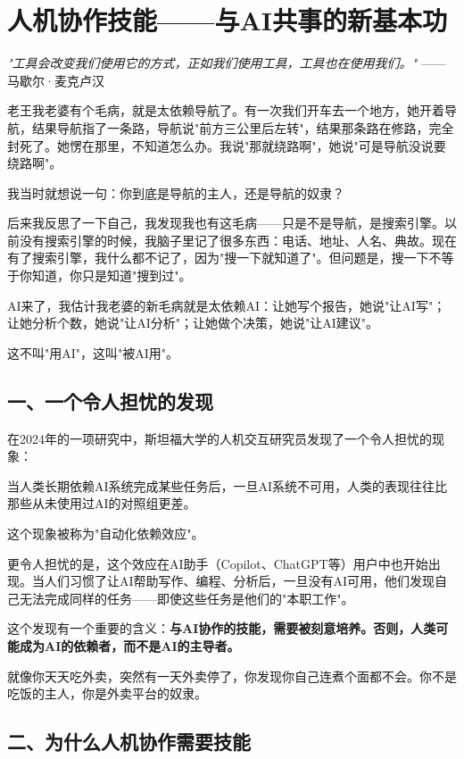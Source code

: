 \chapter{人机协作技能——与AI共事的新基本功}


\textit{"工具会改变我们使用它的方式，正如我们使用工具，工具也在使用我们。"}
——马歇尔·麦克卢汉


老王我老婆有个毛病，就是太依赖导航了。有一次我们开车去一个地方，她开着导航，结果导航指了一条路，导航说"前方三公里后左转"，结果那条路在修路，完全封死了。她愣在那里，不知道怎么办。我说"那就绕路啊"，她说"可是导航没说要绕路啊"。

我当时就想说一句：你到底是导航的主人，还是导航的奴隶？

后来我反思了一下自己，我发现我也有这毛病——只是不是导航，是搜索引擎。以前没有搜索引擎的时候，我脑子里记了很多东西：电话、地址、人名、典故。现在有了搜索引擎，我什么都不记了，因为"搜一下就知道了"。但问题是，搜一下不等于你知道，你只是知道"搜到过"。

AI来了，我估计我老婆的新毛病就是太依赖AI：让她写个报告，她说"让AI写"；让她分析个数，她说"让AI分析"；让她做个决策，她说"让AI建议"。

这不叫"用AI"，这叫"被AI用"。

\section{一、一个令人担忧的发现}


在2024年的一项研究中，斯坦福大学的人机交互研究员发现了一个令人担忧的现象：

当人类长期依赖AI系统完成某些任务后，一旦AI系统不可用，人类的表现往往比那些从未使用过AI的对照组更差。

这个现象被称为"自动化依赖效应"。

更令人担忧的是，这个效应在AI助手（Copilot、ChatGPT等）用户中也开始出现。当人们习惯了让AI帮助写作、编程、分析后，一旦没有AI可用，他们发现自己无法完成同样的任务——即使这些任务是他们的"本职工作"。

这个发现有一个重要的含义：\textbf{与AI协作的技能，需要被刻意培养。否则，人类可能成为AI的依赖者，而不是AI的主导者。}

就像你天天吃外卖，突然有一天外卖停了，你发现你自己连煮个面都不会。你不是吃饭的主人，你是外卖平台的奴隶。

\section{二、为什么人机协作需要技能}


